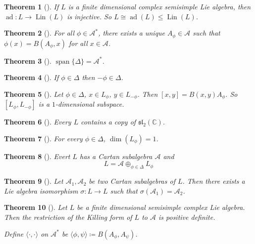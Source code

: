 \documentclass[letterpaper, 10pt]{article}
\theoremstyle{theostyle}
\newtheorem{theorem}{Theorem}[section]
\newenvironment{thmstyle}[1][]{%
    \begin{theorem}[#1]\leavevmode\vspace{-\baselineskip}\myquote%
    }{\endmyquote\end{theorem}}
\begin{document}
\begin{thmstyle}
    If \(L\) is a finite dimensional complex semisimple Lie algebra,
    then \(\operatorname{ad}:L\rightarrow \operatorname{Lin}{(L)}\) is injective.
    So \(L\cong \operatorname{ad}{(L)} \leq \operatorname{Lin}{(L)}\).
\end{thmstyle}

\begin{thmstyle}
    For all \(\phi \in \mathcal{A}^\ast\), there exists a unique \(A_\phi \in \mathcal{A}\) such that \(\phi(x) = B(A_\phi, x)\) for all \(x \in \mathcal{A}\).
\end{thmstyle}

\begin{thmstyle}
    \(\operatorname{span}{\{\Delta\}} = \mathcal{A}^\ast\).
\end{thmstyle}

\begin{thmstyle}
    If \(\phi \in \Delta\) then \(-\phi \in \Delta\).
\end{thmstyle}


\begin{thmstyle}
    Let \(\phi \in \Delta\), \(x \in L_\phi\), \(y \in L_{-\phi}\).
    Then \([x, y] = B(x, y)A_\phi\).
    So \([L_\phi, L_{-\phi}]\) is a \(1\)-dimensional subspace.
\end{thmstyle}

\begin{thmstyle}
    Every \(L\) contains a copy of \(\mathfrak{sl}_2(\mathbb{C})\).
\end{thmstyle}

\begin{thmstyle}
    For every \(\phi \in \Delta\), \(\dim(L_\phi) = 1\).
\end{thmstyle}
\begin{thmstyle}
    Evert \(L\) has a Cartan subalgebra \(\mathcal{A}\) and
    \[L = \mathcal{A} \oplus_{\phi \in \Delta} L_\phi\]
\end{thmstyle}

\begin{thmstyle}
    Let \(\mathcal{A}_1, \mathcal{A}_2\) be two Cartan subalgebras of \(L\).
    Then there exists a Lie algebra isomorphism \(\sigma : L \rightarrow L\) such that \(\sigma(\mathcal{A}_1) = \mathcal{A_2}\).
\end{thmstyle}

\begin{thmstyle}
    Let \(L\) be a finite dimensional semisimple complex Lie algebra.
    Then the restriction of the Killing form of \(L\) to \(\mathcal{A}\) is positive definite.

    Define \(\langle \cdot, \cdot \rangle\) on \(\mathcal{A}^\ast\) be \(\langle \phi, \psi\rangle \coloneqq B(A_\phi, A_\psi)\).
\end{thmstyle}
\end{document}
